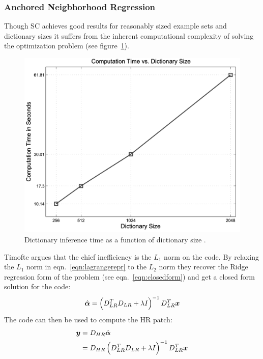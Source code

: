 \subsubsection{Anchored Neigbhorhood Regression}
Though SC achieves good results for reasonably sized example sets and dictionary sizes it suffers from the inherent computational complexity of solving the optimization problem (see figure~\ref{fig:dictspeedspize}).
\begin{figure}[!htbp]
    \centering
    \includegraphics[width=\linewidth,keepaspectratio]{figures/classical/dictsizespeed.png}
    \caption{Dictionary inference time as a function of dictionary size \cite{yang2010}.}
    \label{fig:dictspeedspize}
\end{figure}
%
Timofte \etal \cite{Timofte} argues that the chief inefficiency is the \(L_1\) norm on the code.
%
By relaxing the \(L_1\) norm in eqn.~\eqref{eqn:lagrangerepr} to the \(L_2\) norm they recover the Ridge regression form of the problem (see eqn.~\eqref{eqn:closedform}) and get a closed form solution for the code:
\begin{equation}
    \hat{\bm{\alpha}} = \left( D_{LR}^T D_{LR} + \lambda I\right)^{-1}D_{LR}^T \bm{x}
\end{equation}
The code can then be used to compute the HR patch:
\begin{align}
    \by & = D_{HR} \hat{\bm{\alpha}}                                                               \\
        & = D_{HR} \left( D_{LR}^T D_{LR} + \lambda I\right)^{-1}D_{LR}^T \label{eqn:mappinglr}\bx
\end{align}

